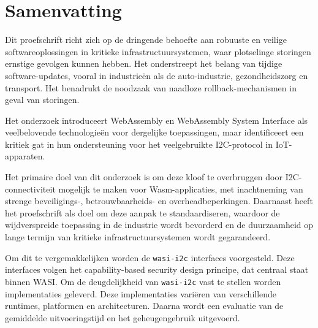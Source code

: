 \chapter*{Samenvatting}

Dit proefschrift richt zich op de dringende behoefte aan robuuste en veilige softwareoplossingen in kritieke infrastructuursystemen, waar plotselinge storingen ernstige gevolgen kunnen hebben. Het onderstreept het belang van tijdige software-updates, vooral in industrieën als de auto-industrie, gezondheidszorg en transport. Het benadrukt de noodzaak van naadloze rollback-mechanismen in geval van storingen. 

Het onderzoek introduceert WebAssembly en WebAssembly System Interface als veelbelovende technologieën voor dergelijke toepassingen, maar identificeert een kritiek gat in hun ondersteuning voor het veelgebruikte I2C-protocol in IoT-apparaten. 

Het primaire doel van dit onderzoek is om deze kloof te overbruggen door I2C-connectiviteit mogelijk te maken voor Wasm-applicaties, met inachtneming van strenge beveiligings-, betrouwbaarheids- en overheadbeperkingen. Daarnaast heeft het proefschrift als doel om deze aanpak te standaardiseren, waardoor de wijdverspreide toepassing in de industrie wordt bevorderd en de duurzaamheid op lange termijn van kritieke infrastructuursystemen wordt gegarandeerd.

Om dit te vergemakkelijken worden de \texttt{wasi-i2c} interfaces voorgesteld. Deze interfaces volgen het capability-based security design principe, dat centraal staat binnen WASI. Om de deugdelijkheid van \texttt{wasi-i2c} vast te stellen worden implementaties geleverd. Deze implementaties variëren van verschillende runtimes, platformen en architecturen. Daarna wordt een evaluatie van de gemiddelde uitvoeringstijd en het geheugengebruik uitgevoerd.

